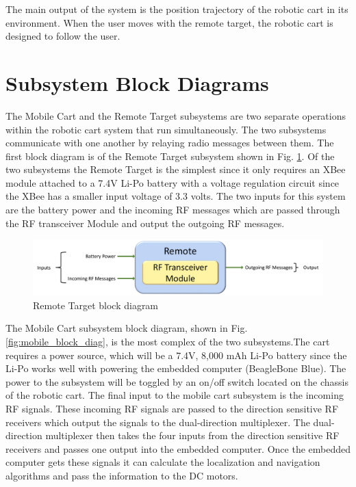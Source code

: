 \vspace*{12pt}
\noindent
The main output of the system is the position trajectory of the robotic cart in its environment. When the user moves with the remote target, the robotic cart is designed to follow the user.



\section{Subsystem Block Diagrams}
The Mobile Cart and the Remote Target subsystems are two separate operations
within the robotic cart system that run simultaneously. The two subsystems
communicate with one another by relaying radio messages between them. The first
block diagram is of the Remote Target subsystem shown in Fig.
\ref{fig:remote_block_diag}. Of the two subsystems the Remote Target is the
simplest since it only requires an XBee module attached to a 7.4V Li-Po battery
with a voltage regulation circuit since the XBee has a smaller input voltage of
3.3 volts. The two inputs for this system are the battery power and the incoming
RF messages which are passed through the RF transceiver Module and output the
outgoing RF messages.

\begin{figure}[H]
  \centering
  \includegraphics[width=\textwidth]{figs/remoteBlockDiagram.pdf}
  \caption{Remote Target block diagram}
  \label{fig:remote_block_diag}
\end{figure}

\vspace*{12pt}
\noindent
The Mobile Cart subsystem block diagram, shown in Fig.
\ref{fig:mobile_block_diag}, is the most complex of the two subsystems.The cart requires a power source, which will be a 7.4V, 8,000 mAh Li-Po battery since the
Li-Po works well with powering the embedded computer (BeagleBone Blue). The
power to the subsystem will be toggled by an on/off switch located on the
chassis of the robotic cart. The final input to the mobile cart subsystem is the
incoming RF signals. These incoming RF signals are passed to the direction
sensitive RF receivers which output the signals to the dual-direction
multiplexer. The dual-direction multiplexer then takes the four inputs from the
direction sensitive RF receivers and passes one output into the embedded
computer. Once the embedded computer gets these signals it can calculate the
localization and navigation algorithms and pass the information to the DC
motors.

